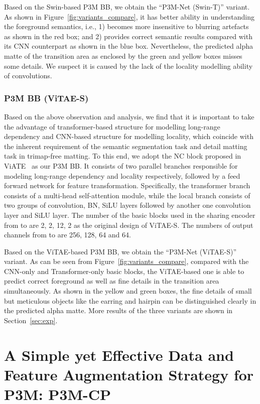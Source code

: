 \documentclass[twocolumn]{svjour3}
\begin{document}
Based on the Swin-based P3M BB, we obtain the ``P3M-Net (Swin-T)'' variant. As shown in Figure~\ref{fig:variants_compare}, it has better ability in understanding the foreground semantics, i.e., 1) becomes more insensitive to blurring artefacts as shown in the red box; and 2) provides correct semantic results compared with its CNN counterpart as shown in the blue box. Nevertheless, the predicted alpha matte of the transition area as enclosed by the green and yellow boxes misses some details. We suspect it is caused by the lack of the locality modelling ability of convolutions.

\subsubsection{P3M BB (ViTAE-S)}

Based on the above observation and analysis, we find that it is important to take the advantage of transformer-based structure for modelling long-range dependency and CNN-based structure for modelling locality, which coincide with the inherent requirement of the semantic segmentation task and detail matting task in trimap-free matting. To this end, we adopt the NC block proposed in ViATE~\citep{vitae} as our P3M BB. It consists of two parallel branches responsible for modeling long-range dependency and locality respectively, followed by a feed forward network for feature transformation. Specifically, the transformer branch consists of a multi-head self-attention module, while the local branch consists of two groups of convolution, BN, SiLU layers followed by another one convolution layer and SiLU layer. The number of the basic blocks used in the sharing encoder from  to  are 2, 2, 12, 2 as the original design of ViTAE-S. The numbers of output channels from  to  are 256, 128, 64 and 64.

Based on the ViTAE-based P3M BB, we obtain the ``P3M-Net (ViTAE-S)'' variant. As can be seen from Figure~\ref{fig:variants_compare}, compared with the CNN-only and Transformer-only basic blocks, the ViTAE-based one is able to predict correct foreground as well as fine details in the transition area simultaneously. As shown in the yellow and green boxes, the fine details of small but meticulous objects like the earring and hairpin can be distinguished clearly in the predicted alpha matte. More results of the three variants are shown in Section~\ref{sec:exp}.




\section{A Simple yet Effective Data and Feature Augmentation Strategy for P3M: P3M-CP}\label{sec:p3mcp}
\end{document}
